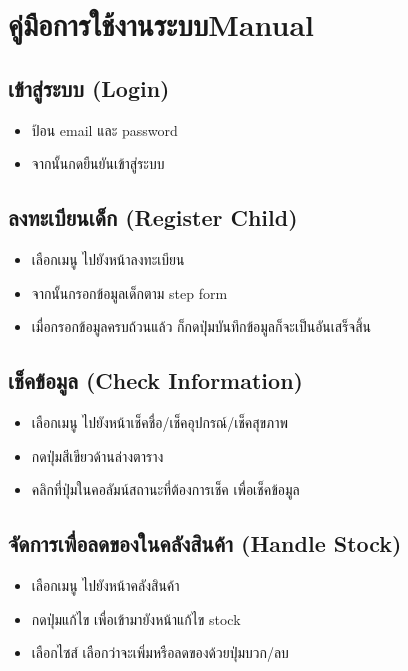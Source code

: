 
\chapter{\ifcpe คู่มือการใช้งานระบบ\else Manual\fi}

\section{เข้าสู่ระบบ (Login)}
\begin{itemize}
    \item ป้อน email และ password 
    \item จากนั้นกดยืนยันเข้าสู่ระบบ 
\end{itemize}

\section{ลงทะเบียนเด็ก (Register Child)}
\begin{itemize}
    \item เลือกเมนู ไปยังหน้าลงทะเบียน
    \item จากนั้นกรอกข้อมูลเด็กตาม step form 
    \item เมื่อกรอกข้อมูลครบถ้วนแล้ว ก็กดปุ่มบันทึกข้อมูลก็จะเป็นอันเสร็จสิ้น
\end{itemize}

\section{เช็คข้อมูล (Check Information)}
\begin{itemize}
    \item เลือกเมนู ไปยังหน้าเช็คชื่อ/เช็คอุปกรณ์/เช็คสุขภาพ
    \item กดปุ่มสีเขียวด้านล่างตาราง
    \item คลิกที่ปุ่มในคอลัมน์สถานะที่ต้องการเช็ค เพื่อเช็คข้อมูล
\end{itemize}

\section{จัดการเพื่อลดของในคลังสินค้า (Handle Stock)}
\begin{itemize}
    \item เลือกเมนู ไปยังหน้าคลังสินค้า
    \item กดปุ่มแก้ไข เพื่อเข้ามายังหน้าแก้ไข stock
    \item เลือกไซส์ เลือกว่าจะเพิ่มหรือลดของด้วยปุ่มบวก/ลบ
\end{itemize}

